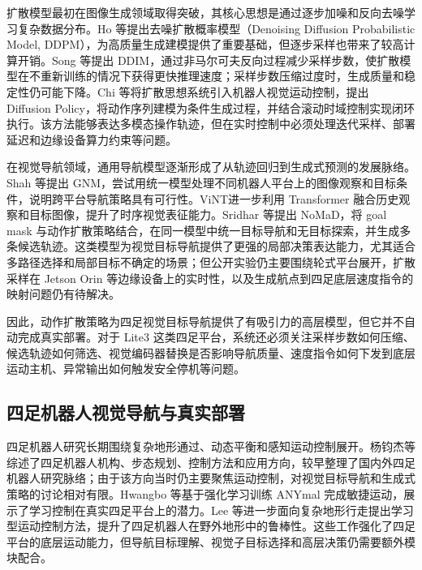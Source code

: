 扩散模型最初在图像生成领域取得突破，其核心思想是通过逐步加噪和反向去噪学习复杂数据分布。Ho 等\cite{ddpm2020}提出去噪扩散概率模型（Denoising Diffusion Probabilistic Model, DDPM），为高质量生成建模提供了重要基础，但逐步采样也带来了较高计算开销。Song 等\cite{ddim2020}提出 DDIM，通过非马尔可夫反向过程减少采样步数，使扩散模型在不重新训练的情况下获得更快推理速度；采样步数压缩过度时，生成质量和稳定性仍可能下降。Chi 等\cite{chi2025diffusion}将扩散思想系统引入机器人视觉运动控制，提出 Diffusion Policy，将动作序列建模为条件生成过程，并结合滚动时域控制实现闭环执行。该方法能够表达多模态操作轨迹，但在实时控制中必须处理迭代采样、部署延迟和边缘设备算力约束等问题。

在视觉导航领域，通用导航模型逐渐形成了从轨迹回归到生成式预测的发展脉络。Shah 等\cite{gnm2022}提出 GNM，尝试用统一模型处理不同机器人平台上的图像观察和目标条件，说明跨平台导航策略具有可行性。ViNT\cite{vint2023}进一步利用 Transformer 融合历史观察和目标图像，提升了时序视觉表征能力。Sridhar 等\cite{nomad2023}提出 NoMaD，将 goal mask 与动作扩散策略结合，在同一模型中统一目标导航和无目标探索，并生成多条候选轨迹。这类模型为视觉目标导航提供了更强的局部决策表达能力，尤其适合多路径选择和局部目标不确定的场景；但公开实验仍主要围绕轮式平台展开，扩散采样在 Jetson Orin 等边缘设备上的实时性，以及生成航点到四足底层速度指令的映射问题仍有待解决。

因此，动作扩散策略为四足视觉目标导航提供了有吸引力的高层模型，但它并不自动完成真实部署。对于 Lite3 这类四足平台，系统还必须关注采样步数如何压缩、候选轨迹如何筛选、视觉编码器替换是否影响导航质量、速度指令如何下发到底层运动主机、异常输出如何触发安全停机等问题。

\subsection{四足机器人视觉导航与真实部署}

四足机器人研究长期围绕复杂地形通过、动态平衡和感知运动控制展开。杨钧杰等\cite{yang2019quadruped_review}综述了四足机器人机构、步态规划、控制方法和应用方向，较早整理了国内外四足机器人研究脉络；由于该方向当时仍主要聚焦运动控制，对视觉目标导航和生成式策略的讨论相对有限。Hwangbo 等\cite{hwangbo2019anymal}基于强化学习训练 ANYmal 完成敏捷运动，展示了学习控制在真实四足平台上的潜力。Lee 等\cite{lee2020learning}进一步面向复杂地形行走提出学习型运动控制方法，提升了四足机器人在野外地形中的鲁棒性。这些工作强化了四足平台的底层运动能力，但导航目标理解、视觉子目标选择和高层决策仍需要额外模块配合。

